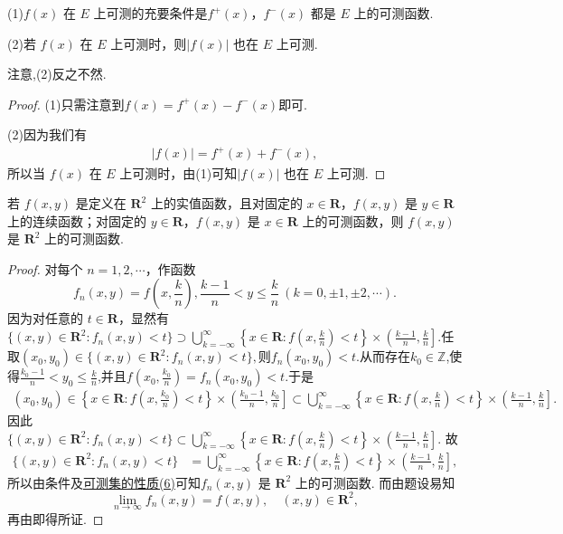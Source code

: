 \documentclass[../../main.tex]{subfiles}
\begin{document}
\begin{theorem}
(1)\(f(x)\) 在 \(E\) 上可测的充要条件是\(f^+(x)\)，\(f^-(x)\) 都是 \(E\) 上的可测函数.

(2)若 \(f(x)\) 在 \(E\) 上可测时，则\(|f(x)|\) 也在 \(E\) 上可测.
\end{theorem}
\begin{remark}
注意,(2)反之不然.
\end{remark}
\begin{proof}
(1)只需注意到$f(x) = f^+(x) - f^-(x)$即可.

(2)因为我们有
\begin{align*}
|f(x)| = f^+(x) + f^-(x), 
\end{align*}
所以当 \(f(x)\) 在 \(E\) 上可测时，由(1)可知\(|f(x)|\) 也在 \(E\) 上可测.
\end{proof}

\begin{proposition}
若 \(f(x,y)\) 是定义在 \(\mathbf{R}^2\) 上的实值函数，且对固定的 \(x \in \mathbf{R}\)，\(f(x,y)\) 是 \(y \in \mathbf{R}\) 上的连续函数；对固定的 \(y \in \mathbf{R}\)，\(f(x,y)\) 是 \(x \in \mathbf{R}\) 上的可测函数，则 \(f(x,y)\) 是 \(\mathbf{R}^2\) 上的可测函数.
\end{proposition}
\begin{proof}
对每个 \(n = 1,2,\cdots\)，作函数
\[
f_n(x,y) = f\left(x,\frac{k}{n}\right), \frac{k - 1}{n} < y \leqslant \frac{k}{n} \ (k = 0, \pm 1, \pm 2,\cdots).
\]
因为对任意的 \(t \in \mathbf{R}\)，显然有$\{(x,y) \in \mathbf{R}^2: f_n(x,y) < t\} 
\supset \bigcup_{k = -\infty}^{\infty}\left\{x \in \mathbf{R}: f\left(x,\frac{k}{n}\right) < t\right\} \times \left(\frac{k - 1}{n}, \frac{k}{n}\right].$任取$(x_0,y_0)\in \{(x,y) \in \mathbf{R}^2: f_n(x,y) < t\},$则$f_n(x_0,y_0)<t$.从而存在$k_0\in \mathbb{Z}$,使得$\frac{k_0-1}{n}<y_0 \leq \frac{k}{n}$,并且$f(x_0,\frac{k_0}{n})=f_n(x_0,y_0)<t$.于是
\begin{align*}
(x_0,y_0)\in\left\{x \in \mathbf{R}: f\left(x,\frac{k_0}{n}\right) < t\right\} \times \left(\frac{k_0 - 1}{n}, \frac{k_0}{n}\right] \subset \bigcup_{k = -\infty}^{\infty}\left\{x \in \mathbf{R}: f\left(x,\frac{k}{n}\right) < t\right\} \times \left(\frac{k - 1}{n}, \frac{k}{n}\right].
\end{align*}
因此$\{(x,y) \in \mathbf{R}^2: f_n(x,y) < t\} 
\subset \bigcup_{k = -\infty}^{\infty}\left\{x \in \mathbf{R}: f\left(x,\frac{k}{n}\right) < t\right\} \times \left(\frac{k - 1}{n}, \frac{k}{n}\right].$
故
\begin{align*}
\{(x,y) \in \mathbf{R}^2: f_n(x,y) < t\} 
&= \bigcup_{k = -\infty}^{\infty}\left\{x \in \mathbf{R}: f\left(x,\frac{k}{n}\right) < t\right\} \times \left(\frac{k - 1}{n}, \frac{k}{n}\right],
\end{align*}
所以由条件及\hyperref[theorem:可测集的性质]{可测集的性质(6)}可知\(f_n(x,y)\) 是 \(\mathbf{R}^2\) 上的可测函数. 而由题设易知
\[
\lim_{n \to \infty}f_n(x,y) = f(x,y), \quad (x,y) \in \mathbf{R}^2,
\]
再由即得所证.
\end{proof}
\end{document}
